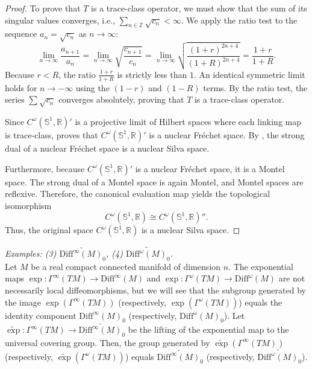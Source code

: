 \documentclass[11pt,reqno]{amsart}
\theoremstyle{definition}
\numberwithin{equation}{section}
\begin{document}
\begin{proof}
To prove that $T$ is a trace-class operator, we must show that the sum of its singular values converges, i.e., $\sum_{n \in \mathbb{Z}} \sqrt{c_n} < \infty$. We apply the ratio test to the sequence $a_n = \sqrt{c_n}$ as $n \to \infty$:
\[
\lim_{n \rightarrow \infty} \frac{a_{n+1}}{a_n} = \lim_{n \rightarrow \infty} \sqrt{\frac{c_{n+1}}{c_n}} = \lim_{n \to \infty} \sqrt{\frac{(1+r)^{2n+4}}{(1+R)^{2n+4}}} = \frac{1+r}{1+R}.
\]
Because $r < R$, the ratio $\frac{1+r}{1+R}$ is strictly less than $1$. An identical symmetric limit holds for $n \to -\infty$ using the $(1-r)$ and $(1-R)$ terms. By the ratio test, the series $\sum \sqrt{c_n}$ converges absolutely, proving that $T$ is a trace-class operator.

Since $C^{\omega}(\mathbb{S}^1, \mathbb{R})'$ is a projective limit of Hilbert spaces where each linking map is trace-class, \cite[Chapter 7.3, Corollary 3]{28} proves that $C^{\omega}(\mathbb{S}^1, \mathbb{R})'$ is a nuclear Fréchet space. By \cite[Chapter IV, Theorem 9.6]{28}, the strong dual of a nuclear Fréchet space is a nuclear Silva space. 

Furthermore, because $C^{\omega}(\mathbb{S}^1, \mathbb{R})'$ is a nuclear Fréchet space, it is a Montel space. The strong dual of a Montel space is again Montel, and Montel spaces are reflexive. Therefore, the canonical evaluation map yields the topological isomorphism
\[
C^{\omega}(\mathbb{S}^1, \mathbb{R}) \cong C^{\omega}(\mathbb{S}^1, \mathbb{R})''.
\]
Thus, the original space $C^{\omega}(\mathbb{S}^1, \mathbb{R})$ is a nuclear Silva space.
\end{proof}

\textit{Examples: (3) $\widetilde{\mathrm{Diff}^\infty(M)_0}$, (4) $\widetilde{\mathrm{Diff}^\omega(M)_0}$.} \\
Let $M$ be a real compact connected manifold of dimension $n$. The exponential maps $\exp : \Gamma^\infty(TM) \to \mathrm{Diff}^\infty(M)$ and $\exp : \Gamma^\omega(TM) \to \mathrm{Diff}^\omega(M)$ are not necessarily local diffeomorphisms, but we will see that the subgroup generated by the image $\exp(\Gamma^\infty(TM))$ (respectively, $\exp(\Gamma^\omega(TM))$) equals the identity component $\mathrm{Diff}^\infty(M)_0$ (respectively, $\mathrm{Diff}^\omega(M)_0$). Let $\widetilde{\exp}: \Gamma^\infty(TM) \to \widetilde{\mathrm{Diff}^\infty(M)_0}$ be the lifting of the exponential map to the universal covering group. Then, the group generated by $\widetilde{\exp}(\Gamma^\infty(TM))$ (respectively, $\widetilde{\exp}(\Gamma^\omega(TM))$) equals $\widetilde{\mathrm{Diff}^\infty(M)_0}$ (respectively, $\widetilde{\mathrm{Diff}^\omega(M)_0}$). 
\end{document}
